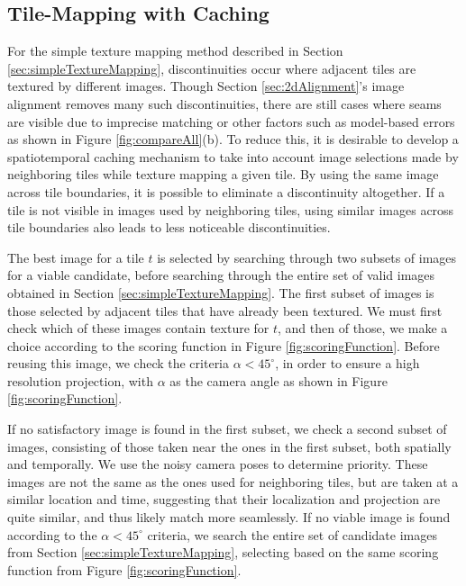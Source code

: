 \documentclass[]{spie}  %
\begin{document}
\subsection{Tile-Mapping with Caching}
\label{sec:mappingWithCaching}
For the simple texture mapping method described in Section
\ref{sec:simpleTextureMapping}, discontinuities occur where adjacent
tiles are textured by different images. Though Section
\ref{sec:2dAlignment}'s image alignment removes many such
discontinuities, there are still cases where seams are visible due to
imprecise matching or other factors such as model-based errors as
shown in Figure \ref{fig:compareAll}(b). To reduce this, it is
desirable to develop a spatiotemporal caching mechanism to take into
account image selections made by neighboring tiles while texture
mapping a given tile. By using the same image across tile boundaries,
it is possible to eliminate a discontinuity altogether. If a tile is
not visible in images used by neighboring tiles, using similar images
across tile boundaries also leads to less noticeable discontinuities.

The best image for a tile $t$ is selected by searching through two
subsets of images for a viable candidate, before searching through the
entire set of valid images obtained in Section
\ref{sec:simpleTextureMapping}. The first subset of images is those
selected by adjacent tiles that have already been textured. We must
first check which of these images contain texture for $t$, and then of
those, we make a choice according to the scoring function in Figure
\ref{fig:scoringFunction}. Before reusing this image, we check the
criteria $\alpha < 45^\circ$, in order to ensure a high resolution
projection, with $\alpha$ as the camera angle as shown in Figure
\ref{fig:scoringFunction}.

If no satisfactory image is found in the first subset, we check a
second subset of images, consisting of those taken near the ones in
the first subset, both spatially and temporally. We use the noisy
camera poses to determine priority. These images are not the same as
the ones used for neighboring tiles, but are taken at a similar
location and time, suggesting that their localization and projection
are quite similar, and thus likely match more seamlessly. If no viable
image is found according to the $\alpha < 45^\circ$ criteria, we
search the entire set of candidate images from Section
\ref{sec:simpleTextureMapping}, selecting based on the same scoring
function from Figure \ref{fig:scoringFunction}.
\end{document}
